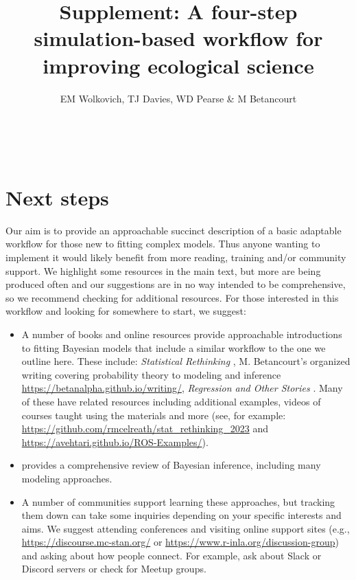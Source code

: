 \documentclass[11pt]{article}
\begin{document}


\renewcommand{\refname}{\CHead{}}


\title{Supplement: A four-step simulation-based workflow for improving ecological science}
\author{EM Wolkovich, TJ Davies, WD Pearse \& M Betancourt}
\maketitle
\

\renewcommand{\thetable}{S\arabic{table}}
\renewcommand{\thefigure}{S\arabic{figure}}

\section*{Next steps}
Our aim is to provide an approachable succinct description of a basic adaptable workflow for those new to fitting complex models. Thus anyone wanting to implement it would likely benefit from more reading, training and/or community support. We highlight some resources in the main text, but more are being produced often and our suggestions are in no way intended to be comprehensive, so we recommend checking for additional resources. For those interested in this workflow and looking for somewhere to start, we suggest:
\begin{itemize}
\item A number of books and online resources provide approachable introductions to fitting Bayesian models that include a similar workflow to the one we outline here. These include: \emph{Statistical Rethinking} \citep{statrethink}, M. Betancourt's organized writing covering probability theory to modeling and inference \url{https://betanalpha.github.io/writing/}, \emph{Regression and Other Stories} \citep{regotherstories}. Many of these have related resources including additional examples, videos of courses taught using the materials and more (see, for example: \url{https://github.com/rmcelreath/stat_rethinking_2023} and \\ \url{https://avehtari.github.io/ROS-Examples/}). 
\item \citet{BDA} provides a comprehensive review of Bayesian inference, including many modeling approaches. 
\item A number of communities support learning these approaches, but tracking them down can take some inquiries depending on your specific interests and aims. We suggest attending conferences and visiting online support sites (e.g., \url{https://discourse.mc-stan.org/} or \url{https://www.r-inla.org/discussion-group}) and asking about how people connect. For example, ask about Slack or Discord servers or check for Meetup groups. 
\end{itemize}
\end{document}

